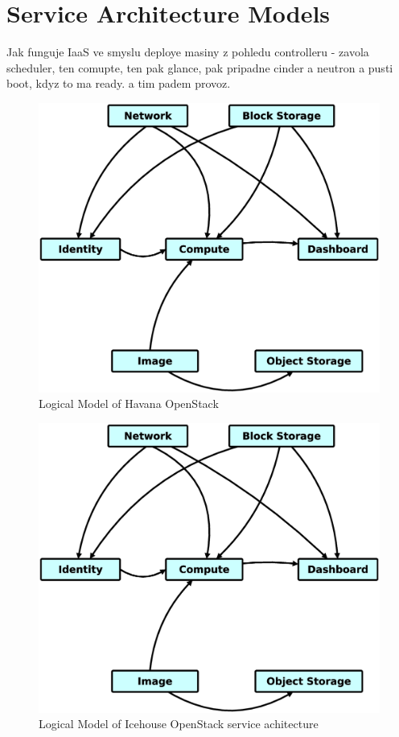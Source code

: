 
\section{Service Architecture Models}

Jak funguje IaaS ve smyslu deploye masiny z pohledu controlleru - zavola scheduler, ten comupte, ten pak glance, pak pripadne cinder a neutron a pusti boot, kdyz to ma ready. a tim padem provoz.

\begin{figure}[!h]
\centering
\includegraphics[scale=.2]{img/openstack_logical_model.eps}
\caption{Logical Model of Havana OpenStack}
\label{fig:cm}
\end{figure}

\begin{figure}[!h]
\centering
\includegraphics[scale=.2]{img/openstack_logical_model.eps}
\caption{Logical Model of Icehouse OpenStack service achitecture}
\label{fig:cm}
\end{figure}

